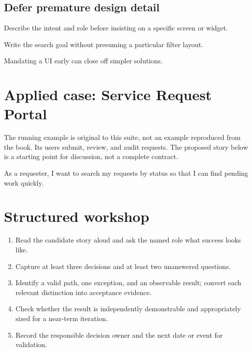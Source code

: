 \documentclass[11pt,letterpaper]{article}
\begin{document}
\subsection{Defer premature design detail}
Describe the intent and role before insisting on a specific screen or widget.

\begin{tcolorbox}[colback=tealback,colframe=navy,title={Engineering translation},breakable]
Write the search goal without presuming a particular filter layout.

\end{tcolorbox}
\begin{tcolorbox}[colback=amberback,colframe=navy,title={Failure mode to watch},breakable]
Mandating a UI early can close off simpler solutions.

\end{tcolorbox}
\section{Applied case: Service Request Portal}
The running example is original to this suite, not an example reproduced from the book. Its users submit, review, and audit requests. The proposed story below is a starting point for discussion, not a complete contract.

\begin{tcolorbox}[colback=blueback,colframe=navy,title={Candidate story},breakable]
As a requester, I want to search my requests by status so that I can find pending work quickly.

\end{tcolorbox}
\section{Structured workshop}
\begin{enumerate}[leftmargin=*,itemsep=3pt]
\item Read the candidate story aloud and ask the named role what success looks like.
\item Capture at least three decisions and at least two unanswered questions.
\item Identify a valid path, one exception, and an observable result; convert each relevant distinction into acceptance evidence.
\item Check whether the result is independently demonstrable and appropriately sized for a near-term iteration.
\item Record the responsible decision owner and the next date or event for validation.
\end{enumerate}
\end{document}

